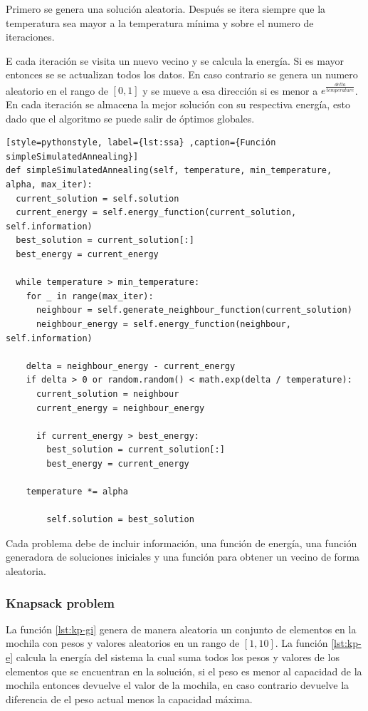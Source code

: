 \documentclass[12pt,twoside]{article}
\begin{document}
	Primero se genera una solución aleatoria. Después se itera siempre que la temperatura sea mayor a la temperatura mínima y sobre el numero de iteraciones. 
	
	E cada iteración se visita un nuevo vecino y se calcula la energía. Si es mayor entonces se se actualizan todos los datos. En caso contrario se genera un numero aleatorio en el rango de $[0, 1]$ y se mueve a esa dirección si es menor a $e^\frac{delta}{temperature}$. En cada iteración se almacena la mejor solución con su respectiva energía, esto dado que el algoritmo se puede salir de óptimos globales.
	
\begin{lstlisting}[style=pythonstyle, label={lst:ssa} ,caption={Función simpleSimulatedAnnealing}]
def simpleSimulatedAnnealing(self, temperature, min_temperature, alpha, max_iter):
  current_solution = self.solution
  current_energy = self.energy_function(current_solution, self.information)
  best_solution = current_solution[:]
  best_energy = current_energy

  while temperature > min_temperature:
  	for _ in range(max_iter):
  	  neighbour = self.generate_neighbour_function(current_solution)
  	  neighbour_energy = self.energy_function(neighbour, self.information)

    delta = neighbour_energy - current_energy
    if delta > 0 or random.random() < math.exp(delta / temperature):
	  current_solution = neighbour
	  current_energy = neighbour_energy

      if current_energy > best_energy:
		best_solution = current_solution[:]
		best_energy = current_energy

	temperature *= alpha

		self.solution = best_solution
\end{lstlisting}
	
	Cada problema debe de incluir información, una función de energía, una función generadora de soluciones iniciales y una función para obtener un vecino de forma aleatoria.
	
	\subsubsection{Knapsack problem}
	
	La función \ref{lst:kp-gi} genera de manera aleatoria un conjunto de elementos en la mochila con pesos y valores aleatorios en un rango de $[1,10]$. La función \ref{lst:kp-e} calcula la energía del sistema la cual suma todos los pesos y valores de los elementos que se encuentran en la solución, si el peso es menor al capacidad de la mochila entonces devuelve el valor de la mochila, en caso contrario devuelve la diferencia de el peso actual menos la capacidad máxima.
	
\end{document}
